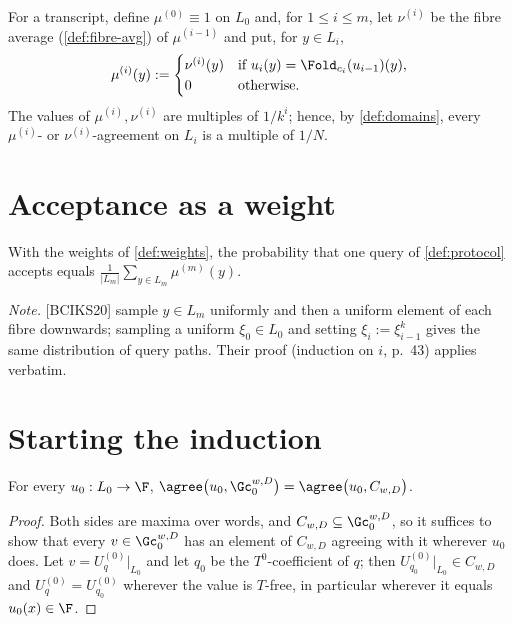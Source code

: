 {{\begin{definition}\label{def:weights}\leanok{}
For a transcript, define $\mu^{(0)}\equiv1$ on $L_0$ and, for $1\le i\le m$, let $\nu^{(i)}$ be
the fibre average (\ref{def:fibre-avg}) of $\mu^{(i-1)}$ and put, for $y\in L_i$,
\[
\mu^{(i)}(y):=\begin{cases}\nu^{(i)}(y)&\text{if }u_i(y)=\Fold_{c_i}(u_{i-1})(y),\\0&\text{otherwise.}\end{cases}
\]
The values of $\mu^{(i)},\nu^{(i)}$ are multiples of $1/k^i$; hence, by \ref{def:domains},
every $\mu^{(i)}$- or $\nu^{(i)}$-agreement on $L_i$ is a multiple of $1/N$.
\end{definition}

\section{Acceptance as a weight}

\begin{imported}\label{ext:claim85}\leanok
With the weights of \ref{def:weights}, the probability that one query of
\ref{def:protocol} accepts equals $\frac1{|L_m|}\sum_{y\in L_m}\mu^{(m)}(y)$.
\end{imported}
\noindent\emph{Note.} [BCIKS20] sample $y\in L_m$ uniformly and then a uniform element of
each fibre downwards; sampling a uniform $\xi_0\in L_0$ and setting $\xi_i:=\xi_{i-1}^k$ gives
the same distribution of query paths. Their proof (induction on $i$, p.~43) applies
verbatim.

\section{Starting the induction}

\begin{lemma}[Start]\label{lem:start}
For every $u_0:L_0\to\F$, $\agree\big(u_0,\Gc_0^{w,D}\big)=\agree\big(u_0,C_{w,D}\big)$.
\end{lemma}

\begin{proof}
Both sides are maxima over words, and $C_{w,D}\subseteq\Gc_0^{w,D}$, so it suffices to show
that every $v\in\Gc_0^{w,D}$ has an element of $C_{w,D}$ agreeing with it wherever $u_0$ does.
Let $v=U^{(0)}_q|_{L_0}$ and let $q_0$ be the $T^0$-coefficient of $q$; then
$U^{(0)}_{q_0}|_{L_0}\in C_{w,D}$ and $U^{(0)}_q=U^{(0)}_{q_0}$ wherever the value is
$T$-free, in particular wherever it equals $u_0(x)\in\F$.
\end{proof}

}}
